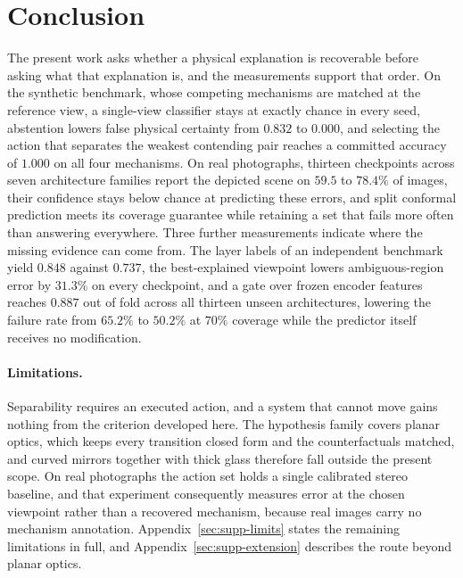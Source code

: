 \documentclass{article} %
\theoremstyle{defstyle}
\theoremstyle{plain}
\begin{document}
\section{Conclusion}
\label{sec:conclusion}

The present work asks whether a physical explanation is recoverable before asking what that
explanation is, and the measurements support that order. On the synthetic benchmark, whose
competing mechanisms are matched at the reference view, a single-view classifier stays at
exactly chance in every seed, abstention lowers false physical certainty from $0.832$ to
$0.000$, and selecting the action that separates the weakest contending pair reaches a
committed accuracy of $1.000$ on all four mechanisms. On real photographs, thirteen
checkpoints across seven architecture families report the depicted scene on $59.5$ to
$78.4\%$ of images, their confidence stays below chance at predicting these errors, and
split conformal prediction meets its coverage guarantee while retaining a set that fails
more often than answering everywhere. Three further measurements indicate where the missing
evidence can come from. The layer labels of an independent benchmark yield $0.848$ against
$0.737$, the best-explained viewpoint lowers ambiguous-region error by $31.3\%$ on every
checkpoint, and a gate over frozen encoder features reaches $0.887$ out of fold across all
thirteen unseen architectures, lowering the failure rate from $65.2\%$ to $50.2\%$ at $70\%$
coverage while the predictor itself receives no modification.

\paragraph{Limitations.} Separability requires an executed action, and a system that cannot
move gains nothing from the criterion developed here. The hypothesis family covers planar
optics, which keeps every transition closed form and the counterfactuals matched, and
curved mirrors together with thick glass therefore fall outside the present scope. On real
photographs the action set holds a single calibrated stereo baseline, and that experiment
consequently measures error at the chosen viewpoint rather than a recovered mechanism,
because real images carry no mechanism annotation. Appendix~\ref{sec:supp-limits} states
the remaining limitations in full, and Appendix~\ref{sec:supp-extension} describes the
route beyond planar optics.
\end{document}
